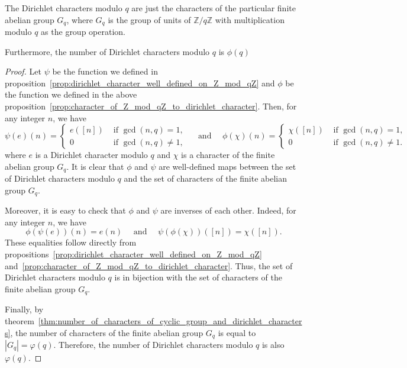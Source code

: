 \documentclass{elegantbook}
\begin{document}
\begin{theorem} \label{thm:dirichlet_characters_and_characters_of_group_of_units}
  The Dirichlet characters modulo $q$ are just the characters of the particular finite abelian group $G_q$, where $G_q$ is the group of units of $\mathbb{Z}/q\mathbb{Z}$ with multiplication modulo $q$ as the group operation.

  Furthermore, the number of Dirichlet characters modulo $q$ is $\phi(q)$
\end{theorem}

\begin{proof}
  Let $\psi$ be the function we defined in proposition~\ref{prop:dirichlet_character_well_defined_on_Z_mod_qZ}
  and $\phi$ be the function we defined in the above proposition~\ref{prop:character_of_Z_mod_qZ_to_dirichlet_character}.
  Then, for any integer $n$, we have
  \[
    \psi(e)(n)=\begin{cases}
      e([n]) & \text{ if } \gcd(n,q) = 1, \\
      0 & \text{ if } \gcd(n,q) \ne 1,
    \end{cases}
    \quad \text{ and } \quad
    \phi(\chi)(n)=\begin{cases}
      \chi([n]) & \text{ if } \gcd(n,q) = 1, \\
      0 & \text{ if } \gcd(n,q) \ne 1.
    \end{cases}
  \]
  where $e$ is a Dirichlet character modulo $q$ and $\chi$ is a character of the finite abelian group $G_q$.
  It is clear that $\phi$ and $\psi$ are well-defined maps between the set of Dirichlet characters modulo $q$
  and the set of characters of the finite abelian group $G_q$.

  Moreover, it is easy to check that $\phi$ and $\psi$ are inverses of each other.
  Indeed, for any integer $n$, we have
  \[
    \phi(\psi(e))(n)=e(n)
    \quad \text{ and } \quad
    \psi(\phi(\chi))([n])=\chi([n]).
  \]
  These equalities follow directly from propositions~\ref{prop:dirichlet_character_well_defined_on_Z_mod_qZ}
  and~\ref{prop:character_of_Z_mod_qZ_to_dirichlet_character}.
  Thus, the set of Dirichlet characters modulo $q$ is in bijection with the set of characters of the finite abelian group $G_q$.

  Finally, by theorem~\ref{thm:number_of_characters_of_cyclic_group_and_dirichlet_characters},
  the number of characters of the finite abelian group $G_q$ is equal to $|G_q|=\varphi(q)$.
  Therefore, the number of Dirichlet characters modulo $q$ is also $\varphi(q)$.
\end{proof}
\end{document}
